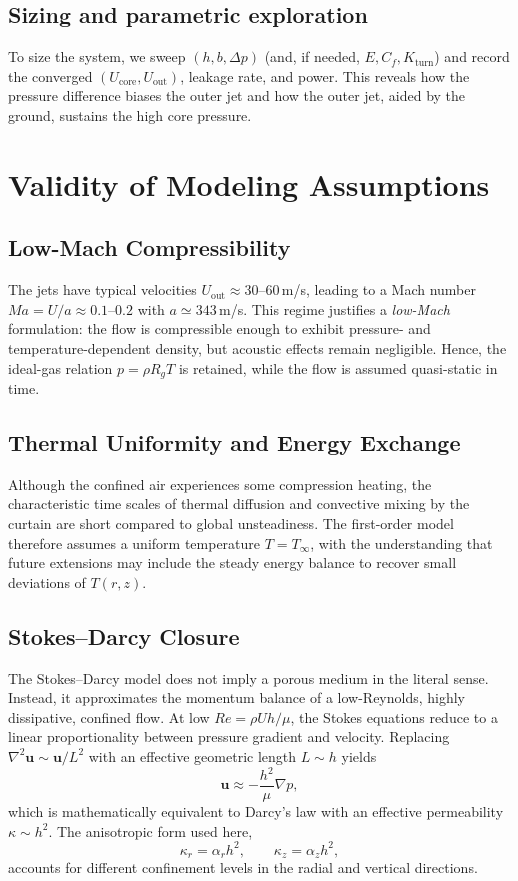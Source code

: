 \documentclass[11pt,a4paper]{article}
\begin{document}
\subsection{Sizing and parametric exploration}
To size the system, we sweep $(h,b,\Delta p)$ (and, if needed, $E,C_f,K_{\mathrm{turn}}$) and record the converged $(U_{\mathrm{core}},U_{\mathrm{out}})$, leakage rate, and power. This reveals how the pressure difference biases the outer jet and how the outer jet, aided by the ground, sustains the high core pressure.


\section{Validity of Modeling Assumptions}
\label{sec:validity-of-modeling-assumptions}

\subsection{Low-Mach Compressibility}
The jets have typical velocities $U_{\mathrm{out}}\approx30$--$60\,$m/s, leading to a Mach number $Ma=U/a\approx0.1$--$0.2$ with $a\simeq343\,$m/s.
This regime justifies a \emph{low-Mach} formulation: the flow is compressible enough to exhibit pressure- and temperature-dependent density, but acoustic effects remain negligible.
Hence, the ideal-gas relation $p=\rho R_g T$ is retained, while the flow is assumed quasi-static in time.

\subsection{Thermal Uniformity and Energy Exchange}
Although the confined air experiences some compression heating, the characteristic time scales of thermal diffusion and convective mixing by the curtain are short compared to global unsteadiness.
The first-order model therefore assumes a uniform temperature $T=T_\infty$, with the understanding that future extensions may include the steady energy balance to recover small deviations of $T(r,z)$.

\subsection{Stokes--Darcy Closure}
The Stokes--Darcy model does not imply a porous medium in the literal sense.
Instead, it approximates the momentum balance of a low-Reynolds, highly dissipative, confined flow.
At low $Re=\rho U h/\mu$, the Stokes equations reduce to a linear proportionality between pressure gradient and velocity.
Replacing $\nabla^2\mathbf{u}\sim \mathbf{u}/L^2$ with an effective geometric length $L\sim h$ yields
\begin{equation}
  \mathbf{u}\approx-\frac{h^2}{\mu}\nabla p,
\end{equation}
which is mathematically equivalent to Darcy's law with an effective permeability $\kappa\sim h^2$.
The anisotropic form used here,
\begin{equation}
  \kappa_r=\alpha_r h^2,\qquad \kappa_z=\alpha_z h^2,
\end{equation}
accounts for different confinement levels in the radial and vertical directions.
\end{document}
